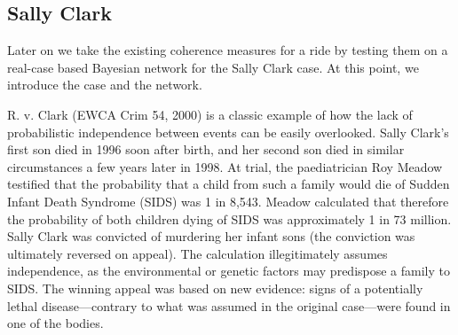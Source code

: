 \documentclass[10pt,]{scrartcl}
\newcommand{\s}[1]{\mbox{\textsf{#1}}}
\begin{document}










\subsection{Sally Clark}



Later on we take the existing coherence measures for a ride by testing them on a real-case based Bayesian network for the Sally Clark case. At this point, we introduce the case and the network.  

R. v. Clark (EWCA Crim 54, 2000) is a classic  example of how the lack of probabilistic independence between events can be easily overlooked. Sally Clark's first son died in 1996 soon after birth, and her second son died in similar circumstances a few years later in 1998.  At trial, the paediatrician Roy Meadow testified that the probability that a child from such a  family would die of Sudden Infant Death Syndrome (SIDS) was 1 in 8,543.  Meadow calculated that therefore the probability of both children dying of SIDS was approximately  1 in 73 million. Sally Clark was convicted of murdering her  infant sons (the conviction was ultimately reversed on appeal). The calculation illegitimately assumes independence,  as the  environmental or genetic factors may predispose a family to SIDS. The winning appeal was based on new evidence: signs of a potentially lethal disease---contrary to what was assumed in the original case---were found in one of the bodies. 
\end{document}
